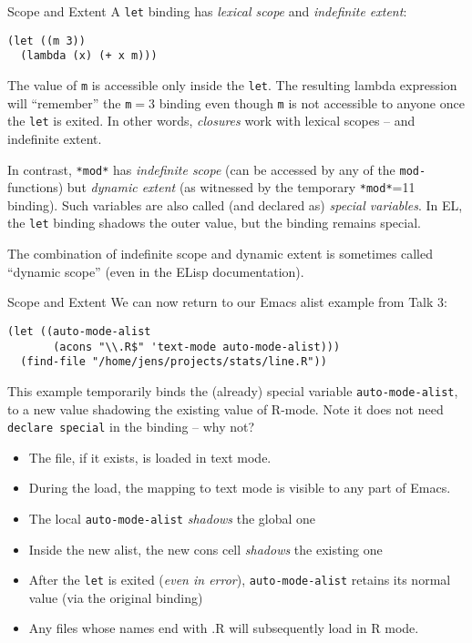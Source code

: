 \documentclass[presentation]{beamer}
\begin{document}
\begin{frame}[fragile]{Scope and Extent}
  A \texttt{let} binding has \emph{lexical scope} and \emph{indefinite extent}:

\begin{verbatim}
(let ((m 3))
  (lambda (x) (+ x m)))
\end{verbatim}
The value of \texttt{m} is accessible only inside the \texttt{let}.  The resulting lambda expression will ``remember'' the \texttt{m}$=3$ binding even though \texttt{m} is not accessible to anyone once the \texttt{let} is exited.  In other words, \emph{closures} work with lexical scopes -- and indefinite extent.

\medskip
In contrast, \texttt{*mod*} has \emph{indefinite scope} (can be accessed by any of the \texttt{mod-} functions) but \emph{dynamic extent} (as witnessed by the temporary \texttt{*mod*}=11 binding).  Such variables are also called (and declared as) \emph{special variables}.  In EL, the \texttt{let} binding shadows the outer value, but the binding remains special.

\medskip
The combination of indefinite scope and dynamic extent is sometimes called ``dynamic scope'' (even in the ELisp documentation).
\end{frame}



\begin{frame}[fragile]{Scope and Extent}
  We can now return to our Emacs alist example from Talk 3:
\begin{verbatim}
(let ((auto-mode-alist
       (acons "\\.R$" 'text-mode auto-mode-alist)))
  (find-file "/home/jens/projects/stats/line.R"))
\end{verbatim}

This example temporarily binds the (already) special variable \texttt{auto-mode-alist}, to a new value shadowing the existing value of R-mode.  Note it does not need \texttt{declare special} in the binding -- why not?

\begin{itemize}
\item The file, if it exists, is loaded in text mode.
\item During the load, the mapping to text mode is visible to any part of Emacs.
\item The local \texttt{auto-mode-alist} \emph{shadows} the global one
\item Inside the new alist, the new cons cell \emph{shadows} the existing one
\item After the \texttt{let} is exited (\emph{even in error}), \texttt{auto-mode-alist} retains its normal value (via the original binding)
\item Any files whose names end with .R will subsequently load in R mode.
\end{itemize}

\end{frame}
\end{document}
